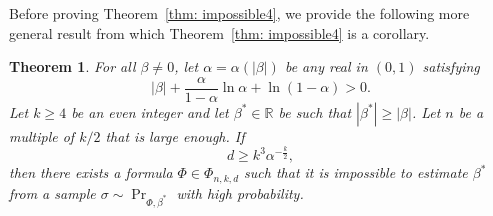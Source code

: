 \documentclass[11pt]{article}
\newtheorem{theorem}{Theorem}[section]
\theoremstyle{definition}
\theoremstyle{remark}
\begin{document}
Before proving Theorem~\ref{thm: impossible4}, we provide the following more general result from which Theorem~\ref{thm: impossible4} is a corollary. 

\begin{theorem}\label{thm: impossible3}
    For all $\beta \neq 0$, 
    let $\alpha=\alpha(|\beta|)$ be any real in $(0,1)$ satisfying
    \begin{equation} \label{eq: alpha def}
        |\beta| + \frac{\alpha}{1-\alpha} \ln{\alpha} + \ln{(1-\alpha)} > 0.
    \end{equation}
    Let  $k \geq 4$ be an even integer and let $\beta^* \in \mathbb{R}$ be such that $|\beta^*|\ge |\beta|$. Let $n$ be a multiple of $k/2$ that is large enough. 
    If
    \begin{equation}\label{eq: alpha bound}
        d \ge k^3 \alpha^{-\frac{k}{2}},
    \end{equation}
    then there exists a formula $\Phi\in \Phi_{n,k,d}$ such that 
    it is impossible to estimate $\beta^*$ from a sample $\sigma \sim \Pr_{\Phi, \beta^*}$ with high probability.
\end{theorem}

 
\end{document}
